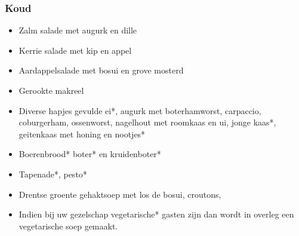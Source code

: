 \subsubsection{Koud}
\begin{itemize}
	\item	Zalm salade met augurk en dille
	\item	Kerrie salade met kip en appel
	\item	Aardappelsalade met bosui en grove mosterd
	\item	Gerookte makreel
	\item	Diverse hapjes gevulde ei*, augurk met boterhamworst, carpaccio, coburgerham, ossenworst, nagelhout met roomkaas en ui, jonge kaas*, geitenkaas met honing en nootjes*
	\item	Boerenbrood* boter* en kruidenboter*
	\item	Tapenade*, pesto*
	\item	Drentse groente gehaktsoep met los de bosui, croutons,
        \item	Indien bij uw gezelschap vegetarische* gasten zijn dan wordt in overleg een vegetarische soep gemaakt.
\end{itemize}
